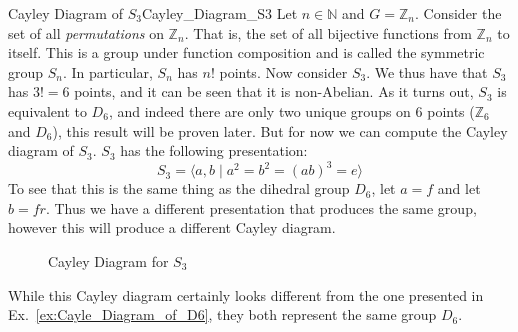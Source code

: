         \begin{lexample}{Cayley Diagram of $S_{3}$}{Cayley_Diagram_S3}
            Let $n\in\mathbb{N}$ and $G=\mathbb{Z}_{n}$. Consider the set of all
            \textit{permutations} on $\mathbb{Z}_{n}$. That
            is, the set of all bijective functions from $\mathbb{Z}_{n}$ to
            itself. This is a group under function composition and is called the
            symmetric group $S_{n}$. In particular, $S_{n}$ has $n!$ points.
            Now consider $S_{3}$. We thus have that $S_{3}$ has $3!=6$ points,
            and it can be seen that it is non-Abelian. As it turns out, $S_{3}$
            is equivalent to $D_{6}$, and indeed there are only two unique
            groups on $6$ points ($\mathbb{Z}_{6}$ and $D_{6}$), this result
            will be proven later. But for now we can compute the Cayley diagram
            of $S_{3}$. $S_{3}$ has the following presentation:
            \begin{equation}
                S_{3}=\langle{a,b}\;|\;a^{2}=b^{2}=(ab)^{3}=e\rangle
            \end{equation}
            To see that this is the same thing as the dihedral group $D_{6}$,
            let $a=f$ and let $b=fr$. Thus we have a different presentation that
            produces the same group, however this will produce a different
            Cayley diagram.
            \begin{figure}[H]
                \centering
                \captionsetup{type=figure}
                
                \caption{Cayley Diagram for $S_{3}$}
                \label{fig:Cayley_Diagram_S3}
            \end{figure}
            While this Cayley diagram certainly looks different from the one
            presented in Ex.~\ref{ex:Cayle_Diagram_of_D6}, they both represent
            the same group $D_{6}$.
        \end{lexample}
